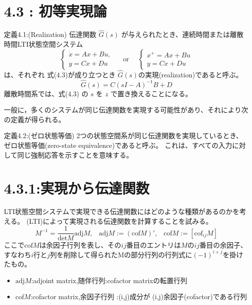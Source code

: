 \documentclass{jsarticle}
\begin{document}

\section*{4.3 : 初等実現論} 
\begin{itembox}[l]{定義4.1:(Realization)}
  伝達関数 $\hat{G} ( s )$ が与えられたとき、連続時間または離散時間LTI状態空間システム 
  \begin{equation}
    \left\{\begin{array} { l } 
    { \dot { x } = A x + B u , } \\
    { y = C x + D u }
    \end{array} \quad \text { or } \quad \left\{\begin{array}{l}
    x^{+}=A x+B u \\
    y=C x+D u
    \end{array}\right.\right. \tag{LTI}
    \end{equation}
  は、それぞれ 式(4.3)が成り立つとき $\hat{G} ( s )$の実現(realization)であると呼ぶ。
  \begin{equation}
    \hat{G}(s) = C(sI-A)^{-1}B+D\tag{4.3}
  \end{equation}
  離散時間系では、式(4.3) の $s$ を $z$ で置き換えることになる。
\end{itembox}
一般に，多くのシステムが同じ伝達関数を実現する可能性があり、それにより次の定義が得られる。

\begin{itembox}[l]{定義4.2:(ゼロ状態等価)}
  2つの状態空間系が同じ伝達関数を実現しているとき、ゼロ状態等価(zero-state equivalence)であると呼ぶ。
   これは、すべての入力に対して同じ強制応答を示すことを意味する。
\end{itembox}

\section*{4.3.1:実現から伝達関数}
LTI状態空間システムで実現できる伝達関数にはどのような種類があるのかを考える。
(LTI)によって実現される伝達関数を計算することを試みる。
\begin{equation}
  M^{-1} = \frac{1}{\text{det}M}\text{adj}M,\;\;\;
  \text{adj}M:={(\text{cof}M)}',\;\;\;
  \text{cof}M:= [\text{cof}_{ij}M]
\end{equation}
ここで$\text{cof} M$は余因子行列を表し、その$ij$番目のエントリは$M$の$ij$番目の余因子、
すなわち$i$行と$j$列を削除して得られたMの部分行列の行列式に$(-1)^{i+j}$を掛けたもの。
\begin{itemize}
  \item $\text{adj}M$:adjoint matrix,随伴行列:cofactor matrixの転置行列
  \item $\text{cof}M$:cofactor matrix,余因子行列 :(i,j)成分が (i,j)余因子(cofactor)である行列
\end{itemize}
\end{document}
